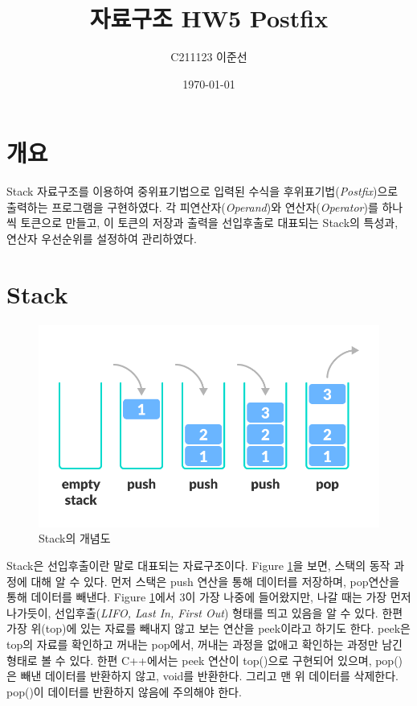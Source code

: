 \documentclass{article}
\title{자료구조 HW5 Postfix}
\author{C211123 이준선}
\date{\today}
\begin{document}
\maketitle

\tableofcontents
\listoffigures
\lstlistoflistings

\section{개요}
Stack 자료구조를 이용하여 중위표기법으로 입력된 수식을 후위표기법(\textit{Postfix})으로 출력하는 프로그램을 구현하였다. 각 피연산자(\textit{Operand})와 연산자(\textit{Operator})를 하나씩 토큰으로 만들고, 이 토큰의 저장과 출력을 선입후출로 대표되는 Stack의 특성과, 연산자 우선순위를 설정하여 관리하였다.
\section{Stack}
\begin{figure} [ht]
    \centering
    \includegraphics{stack.png}
    \caption{Stack의 개념도}
    \label{fig:concept of stack}
\end{figure}
Stack은 선입후출이란 말로 대표되는 자료구조이다. Figure \ref{fig:concept of stack}을 보면, 스택의 동작 과정에 대해 알 수 있다. 먼저 스택은 push 연산을 통해 데이터를 저장하며, pop연산을 통해 데이터를 빼낸다. Figure \ref{fig:concept of stack}에서 3이 가장 나중에 들어왔지만, 나갈 때는 가장 먼저 나가듯이, 선입후출(\textit{LIFO, Last In, First Out}) 형태를 띄고 있음을 알 수 있다. 한편 가장 위(top)에 있는 자료를 빼내지 않고 보는 연산을 peek이라고 하기도 한다. peek은 top의 자료를 확인하고 꺼내는 pop에서, 꺼내는 과정을 없애고 확인하는 과정만 남긴 형태로 볼 수 있다. 한편 C++에서는 peek 연산이 top()으로 구현되어 있으며, pop()은 빼낸 데이터를 반환하지 않고, void를 반환한다. 그리고 맨 위 데이터를 삭제한다. pop()이 데이터를 반환하지 않음에 주의해야 한다.
\end{document}
